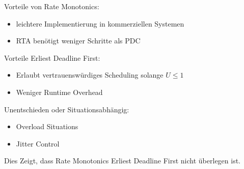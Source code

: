 \begin{frame}{Vorteile von Rate Monotonics:}
	\begin{itemize}
		\item leichtere Implementierung in kommerziellen Systemen
		\item RTA benötigt weniger Schritte als PDC
	\end{itemize}
\end{frame}

\begin{frame}{Vorteile Erliest Deadline First:}
	\begin{itemize}
		\item Erlaubt vertrauenswürdiges Scheduling solange $U \leq 1$
		\item Weniger Runtime Overhead
	\end{itemize}
\end{frame}

\begin{frame}{Unentschieden oder Situationsabhängig:}
	\begin{itemize}
		\item Overload Situations
		\item Jitter Control
	\end{itemize}
\end{frame}
Dies Zeigt, dass Rate Monotonics Erliest Deadline First nicht überlegen ist.